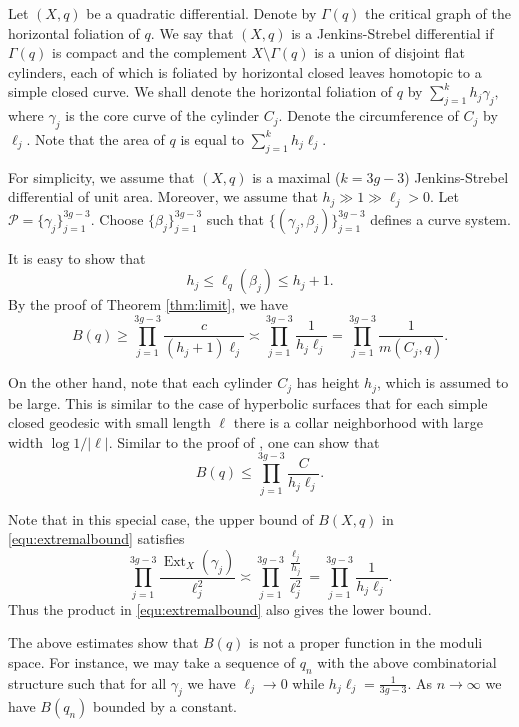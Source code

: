 \documentclass{amsart}
\theoremstyle{plain}
\theoremstyle{definition}
\numberwithin{equation}{section}
\begin{document}
Let  $(X,q)$ be a quadratic differential. Denote by $\Gamma(q)$ the critical graph of the horizontal foliation of 
$q$. We say that $(X,q)$ is a Jenkins-Strebel differential if $\Gamma(q)$ is compact and the complement $X\setminus \Gamma(q)$  is a union of disjoint flat cylinders, each of which is foliated by horizontal closed leaves homotopic to a simple closed curve. We shall denote the horizontal foliation of $q$ by
$\sum\limits_{j=1}^{k} h_j \gamma_j,$
where $\gamma_j$ is the core curve of the cylinder $C_j$.  Denote the circumference of $C_j$ by $\ell_j$. 
Note that the area of $q$ is equal to 
$\sum\limits_{j=1}^{k} h_j \ell_j.$

For simplicity, we assume that $(X,q)$ is a maximal ($k=3g-3$) Jenkins-Strebel differential of unit area. 
Moreover, we assume that $h_j \gg 1 \gg \ell_j >0$. 
Let $\mathcal{P}=\{\gamma_j\}_{j=1}^{3g-3}$. 
Choose $\{\beta_j\}_{j=1}^{3g-3}$ such that $\{(\gamma_j, \beta_j)\}_{j=1}^{3g-3}$ defines a curve system. 


It is easy to show that 
$$ h_j \leq \ell_q(\beta_j) \leq  h_j+ 1.$$
By the proof of Theorem \ref{thm:limit}, we have 
$$B(q) \geq  \prod_{j=1}^{3g-3} \frac{c}{(h_j+1)\ell_j} \asymp \prod_{j=1}^{3g-3} \frac{1}{h_j\ell_j}= 
\prod_{j=1}^{3g-3} \frac{1}{m(C_j, q)}.$$

On the other hand, note that each cylinder $C_j$ has height $h_j$, which is assumed to be large.
This is similar to the case of hyperbolic surfaces that for each  simple closed geodesic with small length $\ell$ there is a collar neighborhood with large width $\log 1/|\ell|$. 
Similar to the proof of \cite[Theorem 1.5]{AA}, one can show that 
$$B(q) \leq \prod_{j=1}^{3g-3} \frac{C}{h_j\ell_j}.$$


Note that in this special case, the upper bound of $B(X,q)$
in \eqref{equ:extremalbound}  satisfies
$$\prod_{j=1}^{3g-3}\frac{\operatorname{Ext}_X(\gamma_j)}
{\ell_j^2} \asymp \prod_{j=1}^{3g-3} \frac{\frac{\ell_j}{h_j}}
{\ell_j^2} = \prod_{j=1}^{3g-3} \frac{1}{h_j\ell_j}.$$
Thus the product in \eqref{equ:extremalbound} also gives the lower bound. 

The above estimates show that $B(q)$ is not a proper function in the moduli space. 
For instance, we may take a sequence of $q_n$ with the above combinatorial structure such that 
for all $\gamma_j$ we have $\ell_j \to 0$ while $h_j\ell_j = \frac{1}{3g-3}$. 
As $n\to \infty$ we have $B(q_n)$ bounded by a constant. 










\end{document}

